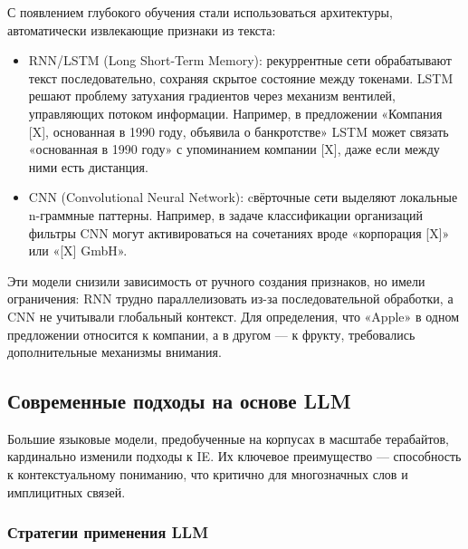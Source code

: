 С появлением глубокого обучения стали использоваться архитектуры, автоматически извлекающие признаки из текста:

\begin{itemize}
    \item RNN/LSTM (Long Short-Term Memory): рекуррентные сети обрабатывают текст последовательно, сохраняя скрытое состояние между токенами. 
    LSTM решают проблему затухания градиентов через механизм вентилей, управляющих потоком информации. 
    Например, в предложении «Компания [X], основанная в 1990 году, объявила о банкротстве» LSTM может связать «основанная в 1990 году» с упоминанием компании [X], даже если между ними есть дистанция.

    \item CNN (Convolutional Neural Network): cвёрточные сети выделяют локальные n-граммные паттерны. 
    Например, в задаче классификации организаций фильтры CNN могут активироваться на сочетаниях вроде «корпорация [X]» или «[X] GmbH».

\end{itemize}

Эти модели снизили зависимость от ручного создания признаков, но имели ограничения: RNN трудно параллелизовать из-за последовательной обработки, а CNN не учитывали глобальный контекст. 
Для определения, что «Apple» в одном предложении относится к компании, а в другом — к фрукту, требовались дополнительные механизмы внимания.

\subsection{Современные подходы на основе LLM}

Большие языковые модели, предобученные на корпусах в масштабе терабайтов, кардинально изменили подходы к IE. Их ключевое преимущество — способность к контекстуальному пониманию, что критично для многозначных слов и имплицитных связей.

\subsubsection{Стратегии применения LLM}

